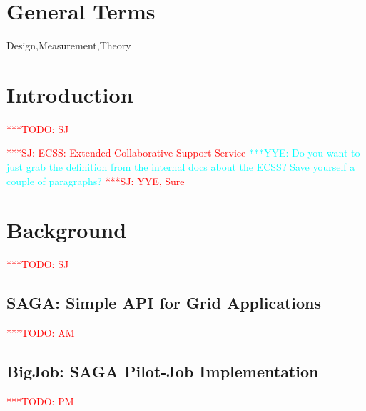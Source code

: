 \documentclass{sig-alternate}
\begin{document}
\newif\ifdraft 
\drafttrue 
\ifdraft
\newcommand{\mrnote}[1]{{\textcolor{green} { ***MR: #1 }}}
\newcommand{\jhanote}[1]{ {\textcolor{red} { ***SJ: #1 }}}
\newcommand{\yyenote}[1]{ {\textcolor{cyan} { ***YYE: #1 }}}
\newcommand{\pmnote}[1]{ {\textcolor{blue} { ***PM: #1 }}}
\newcommand{\todo}[1]{ {\textcolor{red} { ***TODO: #1 }}}
\newcommand{\fix}[1]{ {\textcolor{red} { ***FIX: #1 }}}
\newcommand{\reviewer}[1]{} 
\else \newcommand{\yyenote}[1]{}
\newcommand{\mrmnote}[1]{} \newcommand{\pmnote}[1]{}
\newcommand{\jhanote}[1]{} \newcommand{\todo}[1]{ {\textcolor{red} {
      ***TODO: #1 }}} \newcommand{\fix}[1]{} \fi




\section*{General Terms}{Design,Measurement,Theory}

 \keywords{}

\section{Introduction} \todo{SJ}

\jhanote{ECSS: Extended Collaborative Support Service } \yyenote{Do
  you want to just grab the definition from the internal docs about
  the ECSS? Save yourself a couple of paragraphs?}\jhanote{YYE, Sure}


\section{Background} \todo{SJ}

\subsection{SAGA: Simple API for Grid Applications}
\todo{AM}

\subsection{BigJob: SAGA Pilot-Job Implementation}
\todo{PM}

\end{document}
